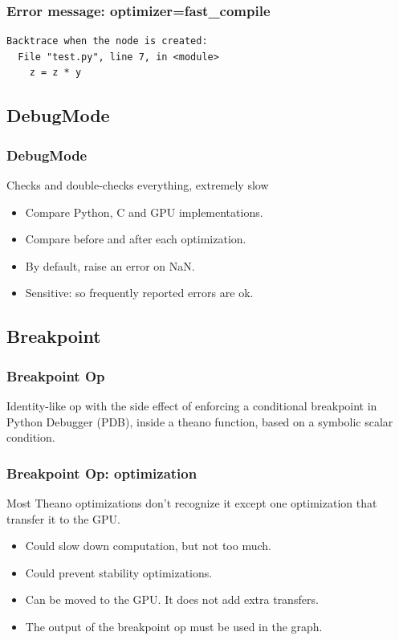 \documentclass[utf8x,xcolor=pdftex,dvipsnames,table]{beamer}
\begin{document}
\begin{frame}[fragile]
  \frametitle{Error message: optimizer=fast\_compile}

\begin{lstlisting}
Backtrace when the node is created:
  File "test.py", line 7, in <module>
    z = z * y

\end{lstlisting}
\end{frame}

\subsection{DebugMode}
\begin{frame}[fragile]
  \frametitle{DebugMode}
    Checks and double-checks everything, extremely slow
\begin{itemize}
\item Compare Python, C and GPU implementations.
\item Compare before and after each optimization.
\item By default, raise an error on NaN.
\item Sensitive: so frequently reported errors are ok.
\end{itemize}
\end{frame}

\subsection{Breakpoint}
\begin{frame}[fragile]
  \frametitle{Breakpoint Op} Identity-like op with the side effect of
  enforcing a conditional breakpoint in Python Debugger (PDB), inside a theano function, based
  on a symbolic scalar condition.
\end{frame}

\begin{frame}[fragile]
  \frametitle{Breakpoint Op: optimization}
 Most Theano optimizations don't recognize it except one
 optimization that transfer it to the GPU.
\begin{itemize}
  \item Could slow down computation, but not too much.
  \item Could prevent stability optimizations.
  \item Can be moved to the GPU. It does not add extra transfers.
  \item The output of the breakpoint op must be used in the graph.
\end{itemize}
\end{frame}
\end{document}
